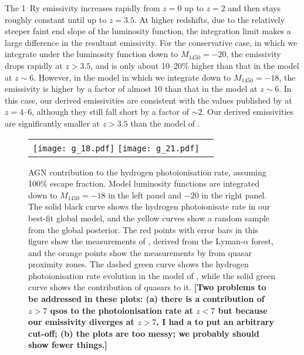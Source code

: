 \documentclass[a4paper,fleqn,usenatbib]{mnras}
\newcommand{\gk}[1]{{\bf \color{notecolor} [#1]}}
\begin{document}
The 1~Ry emissivity increases rapidly from $z=0$ up to $z=2$ and then
stays roughly constant until up to $z=3.5$.  At higher redshifts, due
to the relatively steeper faint end slope of the luminosity function,
the integration limit makes a large difference in the resultant
emissivity.  For the conservative case, in which we integrate under
the luminosity function down to $M_{1450}=-20$, the emissivity drops
rapidly at $z>3.5$, and is only about 10--20\% higher than that in the
\citet{2012ApJ...746..125H} model at $z\sim 6$.  However, in the model
in which we integrate down to $M_{1450}=-18$, the emissivity is higher
by a factor of almost 10 than that in the \citet{2012ApJ...746..125H}
model at $z\sim 6$.  In this case, our derived emissivities are
consistent with the values published by \citet{2015AA...578A..83G} at
$z=4$--$6$, although they still fall short by a factor of $\sim 2$.
Our derived emissivities are significantly smaller at $z>3.5$ than the
model of \citet{2015ApJ...813L...8M}.


\begin{figure*}
  \begin{center}
    \begin{tabular}{cc}
    \texttt{[image: g\_18.pdf]}
    \texttt{[image: g\_21.pdf]}
    \end{tabular}
  \end{center}
  \caption{AGN contribution to the hydrogen photoionisation rate,
    assuming 100\% escape fraction.  Model luminosity functions are
    integrated down to $M_{1450}=-18$ in the left panel and $-20$ in
    the right panel.  The solid black curve shows the hydrogen
    photoionisate rate in our best-fit global model, and the yellow
    curves show a random sample from the global posterior.  The red
    points with error bars in this figure show the measurements of
    \citet{2013MNRAS.436.1023B}, derived from the Lyman-$\alpha$
    forest, and the orange points show the measurements by
    \citet{2011MNRAS.412.2543C} from quasar proximity zones.  The
    dashed green curve shows the hydrogen photoionisation rate
    evolution in the model of \citet{2012ApJ...746..125H}, while the
    solid green curve shows the contribution of quasars to it. \gk{Two
      problems to be addressed in these plots: (a) there is a
      contribution of $z>7$ qsos to the photoionisation rate at $z<7$
      but because our emissivity diverges at $z>7$, I had a to put an
      arbitrary cut-off; (b) the plots are too messy; we probably
      should show fewer things.}}
  \label{fig:gammapi}
\end{figure*}
\end{document}
